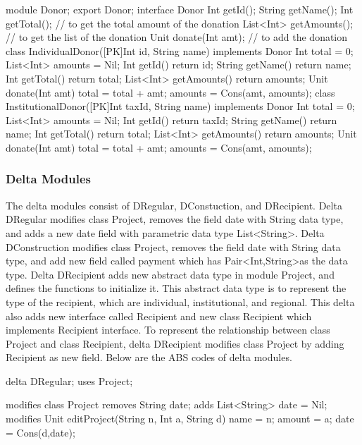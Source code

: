 \documentclass[runningheads,a4paper]{llncs}
\begin{document}
\begin{abscode}
module Donor;
export Donor;
interface Donor {
	Int getId();
	String getName();
	Int getTotal();				// to get the total amount of the donation
	List<Int> getAmounts();		// to get the list of the donation
	Unit donate(Int amt);		// to add the donation
}
class IndividualDonor([PK]Int id, String name) implements Donor { 
	Int total = 0;
	List<Int> amounts = Nil;
	Int getId() { return id; }
	String getName() { return name; }
	Int getTotal() { return total;}
	List<Int> getAmounts() { return amounts; }
	Unit donate(Int amt) {	
		total = total + amt;
		amounts = Cons(amt, amounts);
	}
}
class InstitutionalDonor([PK]Int taxId, String name) implements Donor { 
	Int total = 0;
	List<Int> amounts = Nil;
	Int getId() { return taxId; }
	String getName() { return name; }
	Int getTotal() { return total;}
	List<Int> getAmounts() { return amounts; }
	Unit donate(Int amt) {	
		total = total + amt;
		amounts = Cons(amt, amounts);
	}
}
\end{abscode}

\subsubsection{Delta Modules}
The delta modules consist of DRegular, DConstuction, and DRecipient. Delta DRegular modifies class Project, removes the field date with String data type, and adds a new date field with parametric data type List\textless String\textgreater. Delta DConstruction modifies class Project, removes the field date with String data type, and add new field called payment which has Pair\textless Int,String\textgreater as the data type. Delta DRecipient adds new abstract data type in module Project, and defines the functions to initialize it. This abstract data type is to represent the type of the recipient, which are individual, institutional, and regional. This delta also adds new interface called Recipient and new class Recipient which implements Recipient interface. To represent the relationship between class Project and class Recipient, delta DRecipient modifies class Project by adding Recipient as new field. Below are the ABS codes of delta modules.

\begin{abscode}
delta DRegular;
uses Project;

modifies class Project {
	removes String date;
	adds List<String> date = Nil;
	modifies Unit editProject(String n, Int a, String d) {
		name = n;
		amount = a;
		date = Cons(d,date);
	}
}
\end{abscode}
\end{document}
